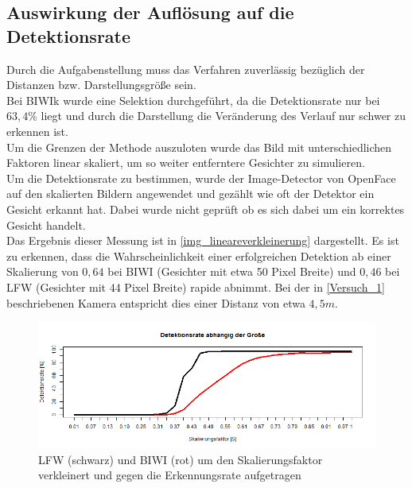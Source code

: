 \subsection{Auswirkung der Auflösung auf die Detektionsrate}
Durch die Aufgabenstellung muss das Verfahren zuverlässig bezüglich der Distanzen bzw. Darstellungsgröße sein.\\
Bei BIWIk wurde eine Selektion durchgeführt, da die Detektionsrate nur bei $63,4\%$ liegt und durch die Darstellung die Veränderung des Verlauf nur schwer zu erkennen ist.\\
Um die Grenzen der Methode auszuloten wurde das Bild mit unterschiedlichen Faktoren linear skaliert, um so weiter entferntere Gesichter zu simulieren.\\
Um die Detektionsrate zu bestimmen, wurde der Image-Detector von OpenFace auf den skalierten Bildern angewendet und gezählt wie oft der Detektor ein Gesicht erkannt hat. Dabei wurde nicht geprüft ob es sich dabei um ein korrektes Gesicht handelt.\\
Das Ergebnis dieser Messung ist in \autoref{img_lineareverkleinerung} dargestellt. Es ist zu erkennen, dass die Wahrscheinlichkeit einer erfolgreichen Detektion ab einer Skalierung von $0,64$ bei BIWI (Gesichter mit etwa 50 Pixel Breite) und $0,46$ bei LFW (Gesichter mit 44 Pixel Breite) rapide abnimmt. Bei der in \autoref{Versuch_1} beschriebenen Kamera entspricht dies einer Distanz von etwa $4,5m$.\\
\begin{figure}[p]
	\centering
	\includegraphics[width=\linewidth]{img_Skalierung/Gesicht_Rate}
	\caption{LFW \cite{database_Face} (schwarz) und BIWI \cite{database_Face_Ori} (rot) um den Skalierungsfaktor verkleinert und gegen die Erkennungsrate aufgetragen}
	\label{img_lineareverkleinerung}
\end{figure}
